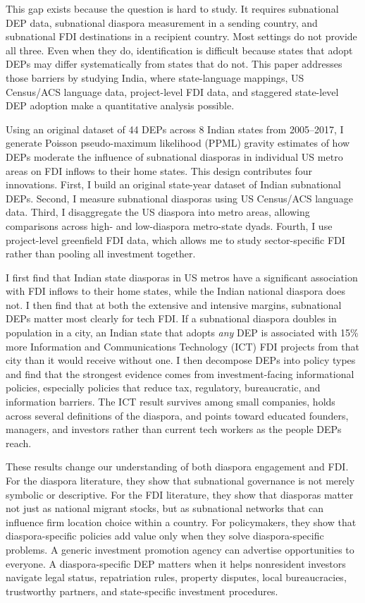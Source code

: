 \documentclass[12pt]{article}
\begin{document}
This gap exists because the question is hard to study. It requires subnational DEP data, subnational diaspora measurement in a sending country, and subnational FDI destinations in a recipient country. Most settings do not provide all three. Even when they do, identification is difficult because states that adopt DEPs may differ systematically from states that do not. This paper addresses those barriers by studying India, where state-language mappings, US Census/ACS language data, project-level FDI data, and staggered state-level DEP adoption make a quantitative analysis possible.

Using an original dataset of 44 DEPs across 8 Indian states from 2005--2017, I generate Poisson pseudo-maximum likelihood (PPML) gravity estimates of how DEPs moderate the influence of subnational diasporas in individual US metro areas on FDI inflows to their home states. This design contributes four innovations. First, I build an original state-year dataset of Indian subnational DEPs. Second, I measure subnational diasporas using US Census/ACS language data. Third, I disaggregate the US diaspora into metro areas, allowing comparisons across high- and low-diaspora metro-state dyads. Fourth, I use project-level greenfield FDI data, which allows me to study sector-specific FDI rather than pooling all investment together.

I first find that Indian state diasporas in US metros have a significant association with FDI inflows to their home states, while the Indian national diaspora does not. I then find that at both the extensive and intensive margins, subnational DEPs matter most clearly for tech FDI. If a subnational diaspora doubles in population in a city, an Indian state that adopts \textit{any} DEP is associated with 15\% more Information and Communications Technology (ICT) FDI projects from that city than it would receive without one. I then decompose DEPs into policy types and find that the strongest evidence comes from investment-facing informational policies, especially policies that reduce tax, regulatory, bureaucratic, and information barriers. The ICT result survives among small companies, holds across several definitions of the diaspora, and points toward educated founders, managers, and investors rather than current tech workers as the people DEPs reach.

These results change our understanding of both diaspora engagement and FDI. For the diaspora literature, they show that subnational governance is not merely symbolic or descriptive. For the FDI literature, they show that diasporas matter not just as national migrant stocks, but as subnational networks that can influence firm location choice within a country. For policymakers, they show that diaspora-specific policies add value only when they solve diaspora-specific problems. A generic investment promotion agency can advertise opportunities to everyone. A diaspora-specific DEP matters when it helps nonresident investors navigate legal status, repatriation rules, property disputes, local bureaucracies, trustworthy partners, and state-specific investment procedures.
\end{document}
